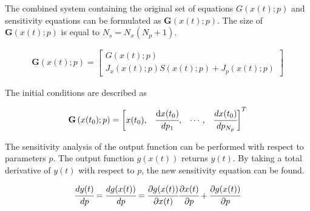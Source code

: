 \documentclass[../Article_Sensitivity_Analsysis.tex]{subfiles}
\begin{document}
	The combined system containing the original set of equations ${G}({x}(t);{p})$ and sensitivity equations can be formulated as ${\textbf{G}}\left({x}(t);{p}\right)$. The size of ${\textbf{G}}\left({x}(t);{p}\right)$ is equal to $N_s = N_x(N_p + 1)$.
	
	{\footnotesize
		\begin{align}
			{\textbf{G}}\left({x}(t);{p}\right) = 
			\begin{bmatrix}
				{G}({x}(t);{p})\\
				{J_x}({x}(t);{p}){S}({x}(t);{p}) + {J_p}({x}(t);{p})
			\end{bmatrix}
	\end{align} }
	
	The initial conditions are described as
	
	{\footnotesize
		\begin{align}
			{\textbf{G}}\left({x}(t_0);{p}\right)  = 
			\begin{bmatrix} {x}(t_0),						& 
				\cfrac{ \text{d}{x}(t_0) }{ d{p_1} },		& 
				\cdots,					 					&
				\cfrac{ d{x}(t_0) }{ d{p_{N_p}} } 
			\end{bmatrix}^T
	\end{align} }
	
	The sensitivity analysis of the output function can be performed with respect to parameters ${p}$. The output function ${g}({x}(t))$ returns ${y}(t)$. By taking a total derivative of ${y}(t)$ with respect to ${p}$, the new sensitivity equation can be found.
	
	{\footnotesize
		\begin{align}
			\cfrac{d {y}(t)}{d{p}} = \cfrac{d {g}({x}(t))}{d{p}} = \cfrac{\partial {g}({x}(t))}{\partial {x}(t)} \cfrac{\partial {x}(t)}{\partial {p}} + \cfrac{\partial {g}({x}(t))}{\partial {p}}
	\end{align} }
	
\end{document}

